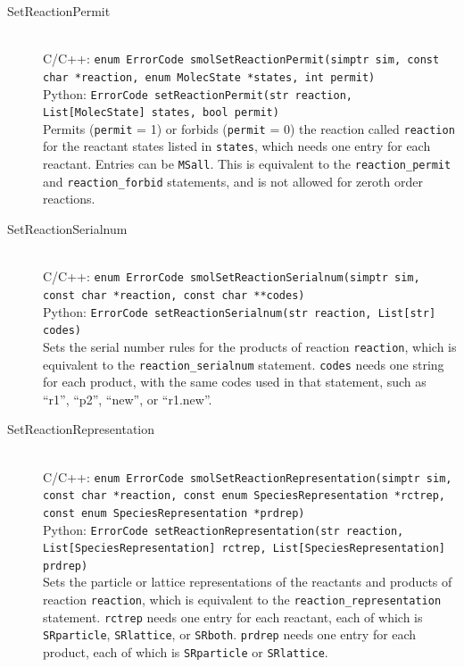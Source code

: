 \documentclass {scrbook}
\newcommand {\ttt} {\texttt}
\begin{document}
\begin{description}
\item[SetReactionPermit]
\hfill \\
C/C++: \ttt{enum ErrorCode smolSetReactionPermit(simptr sim, const char *reaction, enum MolecState *states, int permit)}\\
Python: \ttt{ErrorCode setReactionPermit(str reaction, List[MolecState] states, bool permit)}\\
Permits (\ttt{permit} = 1) or forbids (\ttt{permit} = 0) the reaction called \ttt{reaction} for the reactant states listed in \ttt{states}, which needs one entry for each reactant. Entries can be \ttt{MSall}. This is equivalent to the \ttt{reaction\_permit} and \ttt{reaction\_forbid} statements, and is not allowed for zeroth order reactions.

\item[SetReactionSerialnum]
\hfill \\
C/C++: \ttt{enum ErrorCode smolSetReactionSerialnum(simptr sim, const char *reaction, const char **codes)}\\
Python: \ttt{ErrorCode setReactionSerialnum(str reaction, List[str] codes)}\\
Sets the serial number rules for the products of reaction \ttt{reaction}, which is equivalent to the \ttt{reaction\_serialnum} statement. \ttt{codes} needs one string for each product, with the same codes used in that statement, such as ``r1'', ``p2'', ``new'', or ``r1.new''.

\item[SetReactionRepresentation]
\hfill \\
C/C++: \ttt{enum ErrorCode smolSetReactionRepresentation(simptr sim, const char *reaction, const enum SpeciesRepresentation *rctrep, const enum SpeciesRepresentation *prdrep)}\\
Python: \ttt{ErrorCode setReactionRepresentation(str reaction, List[SpeciesRepresentation] rctrep, List[SpeciesRepresentation] prdrep)}\\
Sets the particle or lattice representations of the reactants and products of reaction \ttt{reaction}, which is equivalent to the \ttt{reaction\_representation} statement. \ttt{rctrep} needs one entry for each reactant, each of which is \ttt{SRparticle}, \ttt{SRlattice}, or \ttt{SRboth}. \ttt{prdrep} needs one entry for each product, each of which is \ttt{SRparticle} or \ttt{SRlattice}.


\end{description}
\end{document}
